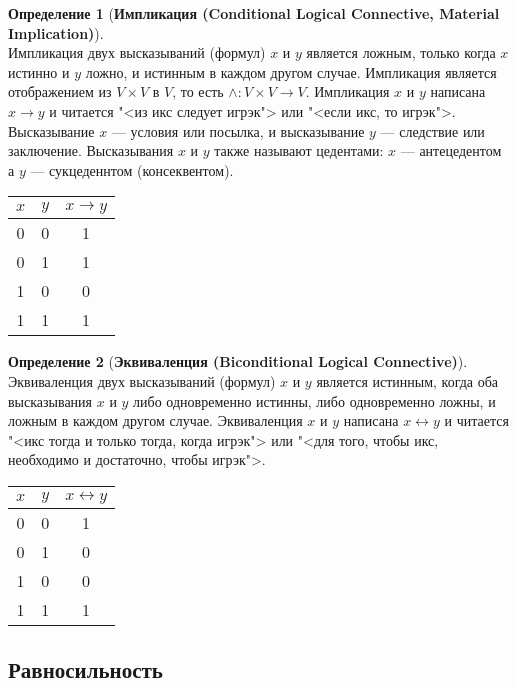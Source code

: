 \documentclass[fleqn,11pt]{article}
\theoremstyle{definition}
\newtheorem{definition}{Определение}
\begin{document}
\begin{definition}[\textbf{Импликация (Conditional Logical Connective, Material Implication)}] ~\\
  Импликация двух высказываний (формул) $x$ и $y$ является ложным, только когда $x$ истинно и $y$ ложно, и
  истинным в каждом другом случае. Импликация является отображением из $V \times V$ в $V$, то есть
  $\land : V \times V \to V$. Импликация $x$ и $y$ написана $x \rightarrow y$ и читается "<из икс
	следует игрэк"> или "<если икс, то игрэк">. Высказывание $x$ \cdash--- условия или посылка, и высказывание
	$y$ \cdash--- следствие или заключение. Высказывания $x$ и $y$ также называют цедентами: $x$ \cdash---
  антецедентом а $y$ \cdash--- сукцеденнтом (консеквентом).
	\begin{center}
		\begin{tabular}{|c|c|c|} \hline
			$x$ & $y$ & $x \to y$  \\ \hline
			0 & 0 & 1 \\
			0 & 1 & 1 \\
			1 & 0 & 0 \\
			1 & 1 & 1 \\
			\hline
		\end{tabular}
	\end{center}
\end{definition}

\begin{definition}[\textbf{Эквиваленция (Biconditional Logical Connective)}] ~\\
	Эквиваленция двух высказываний (формул) $x$ и $y$ является истинным, когда оба высказывания $x$ и $y$
	либо одновременно истинны, либо одновременно ложны, и ложным в каждом другом случае. Эквиваленция $x$ и
	$y$ написана $x \leftrightarrow y$ и читается "<икс тогда и только тогда, когда игрэк"> или
	"<для того, чтобы икс, необходимо и достаточно, чтобы игрэк">.
	\begin{center}
		\begin{tabular}{|c|c|c|} \hline
			$x$ & $y$ & $x \leftrightarrow y$  \\ \hline
			0 & 0 & 1 \\
			0 & 1 & 0 \\
			1 & 0 & 0 \\
			1 & 1 & 1 \\
			\hline
		\end{tabular}
	\end{center}
\end{definition}

\subsection{Равносильность}
\end{document}
